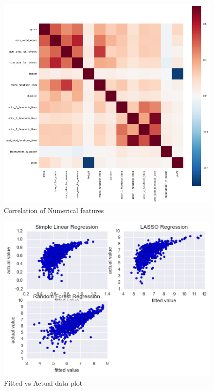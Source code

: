 \documentclass{article}%
\begin{document}
\begin{figure}
\centering
\includegraphics[width=1.0\columnwidth]{Fig/Correlationoffeatures.png}
\caption{Correlation of Numerical features}
\label{fig:Correlationoffeatures}
\end{figure} 

\begin{figure}
\centering
\includegraphics[width=1.0\columnwidth]{Fig/Fitplot.png}
\caption{Fitted vs Actual data plot}
\label{fig:Fitplot}
\end{figure}
\end{document}
